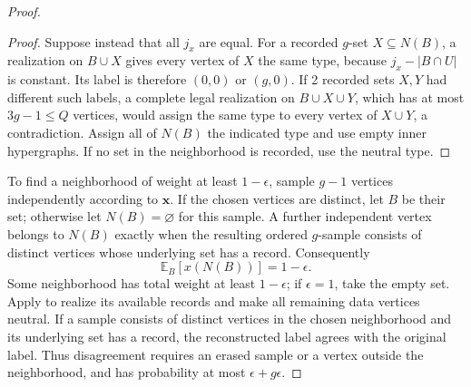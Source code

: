 \documentclass[10pt]{article}
\numberwithin{equation}{section}
\theoremstyle{definition}
\newcommand{\x}{\boldsymbol{x}}\newcommand{\y}{\boldsymbol{y}}
\begin{document}
\begin{proof}
\begin{proof}
Suppose instead that all $j_x$ are equal. For a recorded $g$-set $X\subseteq N(B)$, a realization on $B\cup X$ gives every vertex of $X$ the same type, because $j_x-|B\cap U|$ is constant. Its label is therefore $(0,0)$ or $(g,0)$. If 2 recorded sets $X,Y$ had different such labels, a complete legal realization on $B\cup X\cup Y$, which has at most $3g-1\le Q$ vertices, would assign the same type to every vertex of $X\cup Y$, a contradiction. Assign all of $N(B)$ the indicated type and use empty inner hypergraphs. If no set in the neighborhood is recorded, use the neutral type.
\end{proof}

To find a neighborhood of weight at least $1-\epsilon$, sample $g-1$ vertices independently according to $\x$. If the chosen vertices are distinct, let $B$ be their set; otherwise let $N(B)=\varnothing$ for this sample. A further independent vertex belongs to $N(B)$ exactly when the resulting ordered $g$-sample consists of distinct vertices whose underlying set has a record. Consequently
\[
 \mathbb E_B[x(N(B))]=1-\epsilon.
\]
Some neighborhood has total weight at least $1-\epsilon$; if $\epsilon=1$, take the empty set. Apply  to realize its available records and make all remaining data vertices neutral. If a sample consists of distinct vertices in the chosen neighborhood and its underlying set has a record, the reconstructed label agrees with the original label. Thus disagreement requires an erased sample or a vertex outside the neighborhood, and has probability at most $\epsilon+g\epsilon$.


\end{proof}
\end{document}
